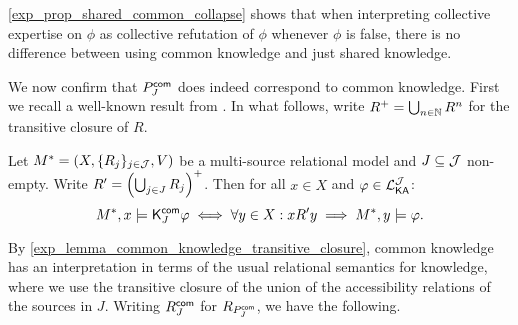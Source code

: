 \cref{exp_prop_shared_common_collapse} shows that when interpreting collective
expertise on $\phi$ as collective refutation of $\phi$ whenever
$\phi$ is false, there is no difference between using common knowledge
and just shared knowledge.

We now confirm that $P^{\mathsf{com}}_J$ does indeed correspond to common
knowledge. First we recall a well-known result from \textcite{fagin2003reasoning}.
In what follows, write $R^+ = \bigcup_{n \in \mathbb{N}}{R^n}$ for the transitive
closure of $R$.

\begin{lemma}
\label{exp_lemma_common_knowledge_transitive_closure}
Let $M^* = (X, \{R_j\}_{j \in \mathcal{J}}, V)$ be a multi-source relational
model and $J \subseteq \mathcal{J}$ non-empty. Write $R' =
\left(\bigcup_{j \in J}{R_j}\right)^+$. Then for all $x \in X$
and $\varphi \in \mathcal{L}_{\mathsf{K}\mathsf{A}}^{\mathcal{J}}$:
\[
M^*, x \models \mathsf{K}^{\mathsf{com}}_J\varphi
\iff
\forall y \in X: x{R'}y \implies M^*, y \models \varphi.\]
\end{lemma}

By \cref{exp_lemma_common_knowledge_transitive_closure}, common knowledge has an
interpretation in terms of the usual relational semantics for knowledge, where
we use the transitive closure of the union of the accessibility relations of
the sources in $J$.
%
Writing $R^{\mathsf{com}}_J$ for $R_{P^{\mathsf{com}}_J}$, we have the following.

